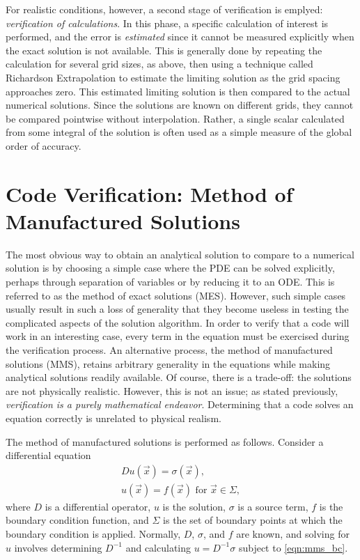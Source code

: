For realistic conditions, however, a second stage of verification is emplyed: \textit{verification of calculations}.
In this phase, a specific calculation of interest is performed, and the error is \textit{estimated} since it cannot be measured explicitly when the exact solution is not available.
This is generally done by repeating the calculation for several grid sizes, as above, then using a technique called Richardson Extrapolation to estimate the limiting solution as the grid spacing approaches zero.
This estimated limiting solution is then compared to the actual numerical solutions.
Since the solutions are known on different grids, they cannot be compared pointwise without interpolation.
Rather, a single scalar calculated from some integral of the solution is often used as a simple measure of the global order of accuracy. %

\section{Code Verification: Method of Manufactured Solutions}

The most obvious way to obtain an analytical solution to compare to a numerical solution is by choosing a simple case where the PDE can be solved explicitly, perhaps through separation of variables or by reducing it to an ODE.
This is referred to as the method of exact solutions (MES).
However, such simple cases usually result in such a loss of generality that they become useless in testing the complicated aspects of the solution algorithm.
In order to verify that a code will work in an interesting case, every term in the equation must be exercised during the verification process.
An alternative process, the method of manufactured solutions (MMS), retains arbitrary generality in the equations while making analytical solutions readily available.
Of course, there is a trade-off: the solutions are not physically realistic.
However, this is not an issue; as stated previously, \textit{verification is a purely mathematical endeavor}.
Determining that a code solves an equation correctly is unrelated to physical realism.

The method of manufactured solutions is performed as follows.
Consider a differential equation
\begin{align}
  Du(\vec{x}) = \sigma(\vec{x}), \label{eqn:mms_de} \\
  u(\vec{x})=f(\vec{x}) \mbox{ for } \vec{x} \in \Sigma,
  \label{eqn:mms_bc}
\end{align}
where $D$ is a differential operator, $u$ is the solution, $\sigma$ is a source term, $f$ is the boundary condition function, and $\Sigma$ is the set of boundary points at which the boundary condition is applied.
Normally, $D$, $\sigma$, and $f$ are known, and solving for $u$ involves determining $D^{-1}$ and calculating $u = D^{-1}\sigma$ subject to \eqref{eqn:mms_bc}.

